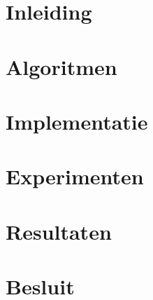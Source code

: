\documentclass[12pt,a4paper]{article}
\begin{document}

\tableofcontents
\section{Inleiding}



\section{Algoritmen}



\section{Implementatie}



\section{Experimenten}



\section{Resultaten}

\section{Besluit}

\listoftodos
\end{document}
